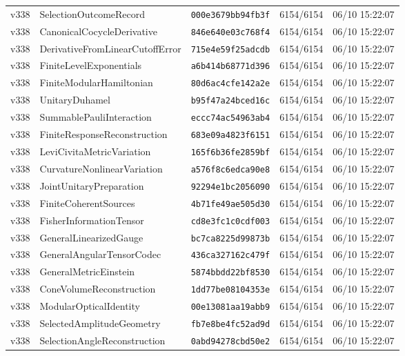 \documentclass[11pt]{article}
\theoremstyle{definition}\newtheorem{deriv}{Derivação}
\begin{document}
{\begin{longtable}{@{}lllll@{}}
v338 & SelectionOutcomeRecord & \texttt{000e3679bb94fb3f} & 6154/6154 & 06/10 15:22:07 \\
v338 & CanonicalCocycleDerivative & \texttt{846e640e03c768f4} & 6154/6154 & 06/10 15:22:07 \\
v338 & DerivativeFromLinearCutoffError & \texttt{715e4e59f25adcdb} & 6154/6154 & 06/10 15:22:07 \\
v338 & FiniteLevelExponentials & \texttt{a6b414b68771d396} & 6154/6154 & 06/10 15:22:07 \\
v338 & FiniteModularHamiltonian & \texttt{80d6ac4cfe142a2e} & 6154/6154 & 06/10 15:22:07 \\
v338 & UnitaryDuhamel & \texttt{b95f47a24bced16c} & 6154/6154 & 06/10 15:22:07 \\
v338 & SummablePauliInteraction & \texttt{eccc74ac54963ab4} & 6154/6154 & 06/10 15:22:07 \\
v338 & FiniteResponseReconstruction & \texttt{683e09a4823f6151} & 6154/6154 & 06/10 15:22:07 \\
v338 & LeviCivitaMetricVariation & \texttt{165f6b36fe2859bf} & 6154/6154 & 06/10 15:22:07 \\
v338 & CurvatureNonlinearVariation & \texttt{a576f8c6edca90e8} & 6154/6154 & 06/10 15:22:07 \\
v338 & JointUnitaryPreparation & \texttt{92294e1bc2056090} & 6154/6154 & 06/10 15:22:07 \\
v338 & FiniteCoherentSources & \texttt{4b71fe49ae505d30} & 6154/6154 & 06/10 15:22:07 \\
v338 & FisherInformationTensor & \texttt{cd8e3fc1c0cdf003} & 6154/6154 & 06/10 15:22:07 \\
v338 & GeneralLinearizedGauge & \texttt{bc7ca8225d99873b} & 6154/6154 & 06/10 15:22:07 \\
v338 & GeneralAngularTensorCodec & \texttt{436ca327162c479f} & 6154/6154 & 06/10 15:22:07 \\
v338 & GeneralMetricEinstein & \texttt{5874bbdd22bf8530} & 6154/6154 & 06/10 15:22:07 \\
v338 & ConeVolumeReconstruction & \texttt{1dd77be08104353e} & 6154/6154 & 06/10 15:22:07 \\
v338 & ModularOpticalIdentity & \texttt{00e13081aa19abb9} & 6154/6154 & 06/10 15:22:07 \\
v338 & SelectedAmplitudeGeometry & \texttt{fb7e8be4fc52ad9d} & 6154/6154 & 06/10 15:22:07 \\
v338 & SelectionAngleReconstruction & \texttt{0abd94278cbd50e2} & 6154/6154 & 06/10 15:22:07 \\

\end{longtable}}
\end{document}
